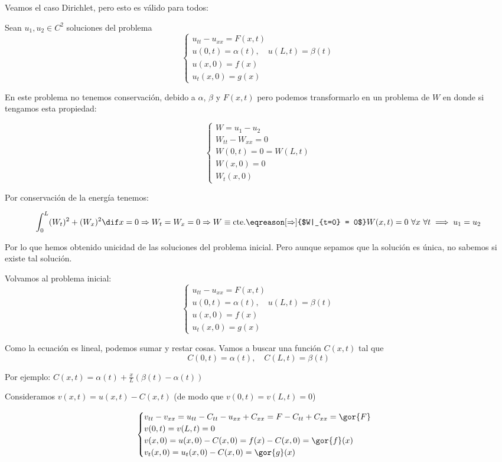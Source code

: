 		 	Veamos el caso Dirichlet, pero esto es válido para todos:

		 	Sean $u_1,u_2 \in C^2$ soluciones del problema
			\[ \begin{cases}
				u_{tt} - u_{xx} = F(x,t)\\
				u(0,t) = \alpha(t), \quad u(L,t) = \beta(t) \\
				u(x,0) = f(x) \\
				u_t(x,0) = g(x)
			\end{cases}\]

			En este problema no tenemos conservación, debido a $\alpha$, $\beta$ y $F(x,t)$ pero podemos transformarlo en un problema de $W$ en donde si tengamos esta propiedad:

			\[\begin{cases}
				W = u_1 - u_2 \\
				W_{tt} - W_{xx} = 0 \\
				W(0,t) = 0 = W(L,t) \\
				W(x,0) = 0 \\
				W_t(x,0)
			\end{cases}\]

			Por conservación de la energía tenemos:

			\[ \int_0^L (W_t)^2 + (W_x)^2 \dif x = 0 \Rightarrow W_t = W_x = 0 \Rightarrow W \equiv \text{cte.} \eqreason[\Rightarrow]{$W|_{t=0} = 0$} W(x,t) = 0 \ \forall x\ \forall t \implies u_1 = u_2 \]

			Por lo que hemos obtenido unicidad de las soluciones del problema inicial. Pero aunque sepamos que la solución es única, no sabemos si existe tal solución.

			Volvamos al problema inicial:
			\[ \begin{cases}
				u_{tt} - u_{xx} = F(x,t)\\
				u(0,t) = \alpha(t), \quad u(L,t) = \beta(t) \\
				u(x,0) = f(x) \\
				u_t(x,0) = g(x)
			\end{cases}\]

			Como la ecuación es lineal, podemos sumar y restar cosas. Vamos a buscar una función $C(x,t)$ tal que
			\[ C(0,t) = \alpha(t), \quad C(L,t) = \beta(t) \]

			Por ejemplo: $C(x,t) = \alpha(t) + \frac{x}{L} (\beta(t)-\alpha(t))$

			Consideramos $v(x,t) = u(x,t) - C(x,t)$ (de modo que $v(0,t) = v(L,t) = 0$)

			\[\begin{cases}
				v_{tt} - v_{xx} = u_{tt} - C_{tt} - u_{xx} + C_{xx} = F - C_{tt} + C_{xx} = \gor{F} \\
				v(0,t) = v(L,t) = 0 \\
				v(x,0) = u(x,0) - C(x,0) = f(x) - C(x,0) = \gor{f}(x) \\
				v_t (x,0) = u_t(x,0) - C(x,0) = \gor{g}(x)
			\end{cases}
			\]

